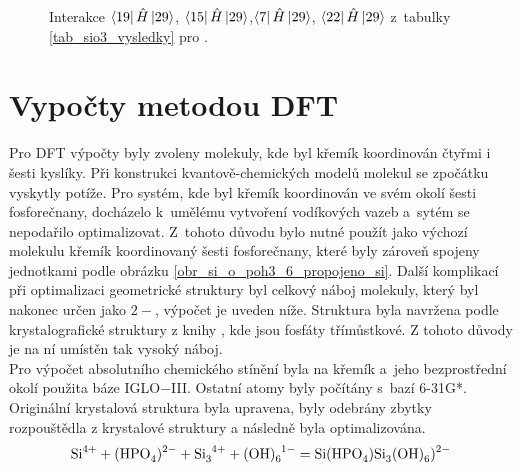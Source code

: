 \documentclass[
  printed, %
  table,   %
  lof,     %
  lot,     %
  oneside,
]{fithesis3}
\begin{document}
\begin{figure}
\begin{center}
{\label{obr_sio3_MO_41}}
\caption{Interakce $\bra{19}{\hat{H}}\ket{29}$, $\bra{15}{\hat{H}}\ket{29}$,$\bra{7}{\hat{H}}\ket{29}$, $\bra{22}{\hat{H}}\ket{29}$ z~tabulky \ref{tab_sio3_vysledky} pro .}
\label{obr_sio3p_vysledky_I}\end{center}
\end{figure} 
  
\section{Vypočty metodou DFT} \label{kapitola_DFT}
Pro DFT výpočty byly zvoleny molekuly, kde byl křemík koordinován čtyřmi i šesti kyslíky. Při konstrukci kvantově-chemických modelů molekul se zpočátku vyskytly potíže. Pro systém, kde byl křemík koordinován ve svém okolí šesti fosforečnany, docházelo k~umělému vytvoření vodíkových vazeb a~sytém se nepodařilo optimalizovat. Z~tohoto důvodu bylo nutné použít jako výchozí molekulu křemík koordinovaný šesti fosforečnany, které byly zároveň spojeny jednotkami  podle obrázku \ref{obr_si_o_poh3_6_propojeno_si}. Další komplikací při optimalizaci geometrické struktury byl celkový náboj molekuly, který byl nakonec určen jako $2-$, výpočet je uveden níže. Struktura  byla navržena podle krystalografické struktury z knihy \cite{korotcenkov2013handbook}, kde jsou fosfáty třímůstkové. Z tohoto důvody je na ní umístěn tak vysoký náboj.\\
Pro výpočet absolutního chemického stínění byla na křemík a~jeho bezprostřední okolí použita báze IGLO$-$III. Ostatní atomy byly počítány s~bazí 6-31G*. Originální krystalová struktura byla upravena, byly odebrány zbytky rozpouštědla z krystalové struktury a následně byla optimalizována.
\begin{displaymath}
\ce{Si}^{4+} + \ce{(HPO4)^{2-}} + \ce{Si3^{4+}} + \ce{(OH)6^1-} = \ce{Si(HPO4)Si3(OH)6)^{2-}}
\end{displaymath}
\end{document}
